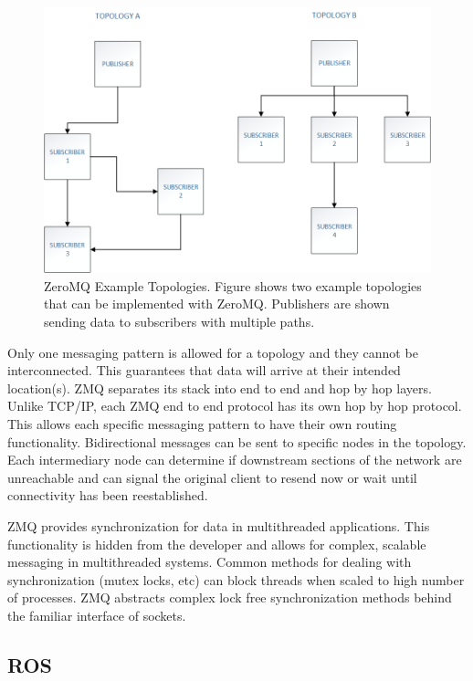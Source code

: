 \begin{figure}[thpb]
 \centering
 \includegraphics[width=1.0\columnwidth]{./images/zmqtopology.png}
  \caption{ZeroMQ Example Topologies\cite{ZMQTHEORY}. Figure shows two example topologies that can be implemented with ZeroMQ. Publishers are shown sending data to subscribers with multiple paths.}
  \label{fig:zmq top}
\end{figure} 

Only one messaging pattern is allowed for a topology and they cannot be interconnected\cite{ZMQTHEORY}. This guarantees that data will arrive at their intended location(s). ZMQ separates its stack into end to end and hop by hop layers. Unlike TCP/IP, each ZMQ end to end protocol has its own hop by hop protocol\cite{ZMQTHEORY}. This allows each specific messaging pattern to have their own routing functionality. Bidirectional messages can be sent to specific nodes in the topology. Each intermediary node can determine if downstream sections of the network are unreachable and can signal the original client to resend now or wait until connectivity has been reestablished. 

ZMQ provides synchronization for data in multithreaded applications\cite{MULTITHREADZMQ}. This functionality is hidden from the developer and allows for complex, scalable messaging in multithreaded systems\cite{MULTITHREADZMQ}. Common methods for dealing with synchronization (mutex locks, etc) can block threads when scaled to high number of processes. ZMQ abstracts complex lock free synchronization methods behind the familiar interface of sockets\cite{MULTITHREADZMQ}.

\subsection{ROS}

